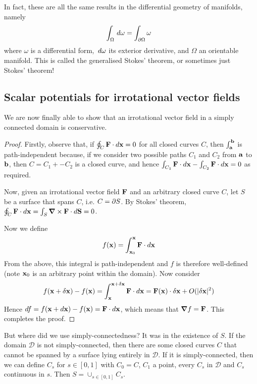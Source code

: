 \documentclass{../../template/note}
\begin{document}
    In fact, these are all the same results in the differential geometry of manifolds, namely
    \begin{align*}
        \int_\Omega \,d{\omega} = \int_{\partial \Omega} \omega 
    \end{align*}
    where \(\omega\) is a differential form, \(\,d{\omega}\) its exterior derivative, and \(\Omega\) an orientable manifold. This is called the generalised Stokes' theorem, or sometimes just Stokes' theorem!
    
    \subsection{Scalar potentials for irrotational vector fields}

    We are now finally able to show that an irrotational vector field in a simply connected domain is conservative.

    \begin{proof}
        Firstly, observe that, if \(\oint_C \V F \cdot d\V x = 0\) for all closed curves \(C\), then \(\int_{\V a}^{\V b}\) is path-independent because, if we consider two possible paths \(C_1\) and \(C_2\) from \(\V a\) to \(\V b\), then \(C = C_1 + -C_2\) is a closed curve, and hence \(\int_{C_1} \V F \cdot d\V x - \int_{C_2} \V F \cdot d\V x = 0\) as required.

        Now, given an irrotational vector field \(\V F\) and an arbitrary closed curve \(C\), let \(S\) be a surface that spans \(C\), i.e. \(C = \partial S\). By Stokes' theorem, \(\oint_C \V F \cdot d\V x = \int_S \curl \V F \cdot d\V S = 0\).

        Now we define
        \begin{align*}
            f(\V x) = \int_{\V x_0}^{\V x} \V F \cdot d\V x
        \end{align*}
        From the above, this integral is path-independent and \(f\) is therefore well-defined (note \(\V x_0\) is an arbitrary point within the domain). Now consider
        \begin{align*}
            f(\V x + \delta \V x) - f(\V x) = \int_{\V x}^{\V x + \delta \V x} \V F \cdot d\V x = \V F(\V x) \cdot \delta \V x + O(|\delta \V x|^2)
        \end{align*}
        Hence \(df = f(\V x + d\V x) - f(\V x) = \V F \cdot d\V x\), which means that \(\grad f = \V F\). This completes the proof.
    \end{proof}
    
    \begin{remark*}
        But where did we use simply-connectedness? It was in the existence of \(S\). If the domain \(\mathscr D\) is not simply-connected, then there are some closed curves \(C\) that cannot be spanned by a surface lying entirely in \(\mathscr D\). If it is simply-connected, then we can define \(C_s\) for \(s \in [0, 1]\) with \(C_0 = C\), \(C_1\) a point, every \(C_s\) in \(\mathscr D\) and \(C_s\) continuous in \(s\). Then \(S = \cup_{s \in [0, 1]} C_s\).
    \end{remark*}
    
\end{document}

